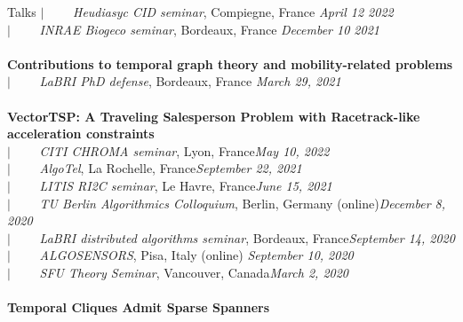 \documentclass[french]{resume} %
\begin{document}
\begin{rSection}{Talks}
		$| \qquad$ \textit{Heudiasyc CID seminar}, Compiegne, France \hfill {\em April 12 2022} \\
		$| \qquad$ \textit{INRAE Biogeco seminar}, Bordeaux, France \hfill {\em December 10 2021} 
		\\ \\
		{\bf Contributions to temporal graph theory and mobility-related problems} \\
		$| \qquad$ \textit{LaBRI PhD defense}, Bordeaux, France\hfill {\em 
			March 29, 2021} 
		\\ \\	
		{\bf VectorTSP: A Traveling Salesperson Problem with Racetrack-like acceleration constraints}\\
		$| \qquad$ \textit{CITI CHROMA seminar}, Lyon, France\hfill {\em May 10, 2022}\\
		$| \qquad$ \textit{AlgoTel}, La Rochelle, France\hfill {\em September 22, 2021}\\
		$| \qquad$ \textit{LITIS RI2C seminar}, Le Havre, France\hfill {\em June 15, 2021}\\
		$| \qquad$ \textit{TU Berlin Algorithmics Colloquium}, Berlin, Germany (online)\hfill {\em December 8, 2020}\\
		$| \qquad$ \textit{LaBRI distributed algorithms seminar}, Bordeaux, France\hfill {\em September 14, 2020}\\
		$| \qquad$ \textit{ALGOSENSORS}, Pisa, Italy (online) \hfill {\em September 10, 2020} \\
		$| \qquad$ \textit{SFU Theory Seminar}, Vancouver, Canada\hfill {\em March 2, 2020}
		\\ \\
		{\bf Temporal Cliques Admit Sparse Spanners} \\

\end{rSection}
\end{document}
